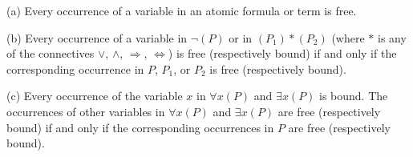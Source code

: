 (a) Every occurrence of a variable in an atomic formula or term is free.

(b) Every occurrence of a variable in $\neg(P)$ or in $(P_1) * (P_2)$ (where $*$ is any of the connectives $\vee$, $\wedge$, $\Rightarrow$, $\Leftrightarrow$) is free (respectively bound) if and only if the corresponding occurrence in $P$, $P_1$, or $P_2$ is free (respectively bound).

(c) Every occurrence of the variable $x$ in $\forall x(P)$ and $\exists x(P)$ is bound. The occurrences of other variables in $\forall x(P)$ and $\exists x(P)$ are free (respectively bound) if and only if the corresponding occurrences in $P$ are free (respectively bound).
